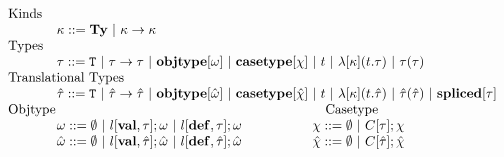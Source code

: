 \begin{figure}[ht]
\[
	\begin{array}{llcl}
      \text{Kinds}\\
      ~~~~~~~~~~~	\kappa ::=  \mathbf{Ty}  ~|~ \kappa \rightarrow \kappa\\
      \text{Types}\\
      ~~~~~~~~~~~	 \tau  ::=  \mathtt{T} ~|~ \tau \rightarrow \tau ~|~ \mathbf{objtype}[\omega] ~|~ \mathbf{casetype}[\chi] ~|~  t ~|~ \lambda[\kappa](t.\tau) ~|~ \tau(\tau) \\
      \text{Translational Types}\\
      ~~~~~~~~~~~\hat{\tau} ::= \mathtt{T} ~|~ \hat\tau \rightarrow \hat\tau ~|~ \mathbf{objtype}[\hat\omega] ~|~ \mathbf{casetype}[\hat\chi] ~|~  t ~|~ \lambda[\kappa](t.\hat\tau) ~|~ \hat\tau(\hat\tau) ~|~ \mathbf{spliced}[\tau]\\
      \text{Objtype}~~~~~~~~~~~~~~~~~~~~~~~~~~~~~~~~~~~~~~~~~~~~~~~~~~~~~~~~~~~~~\text{Casetype}\\
      ~~~~~~~~~~~\omega ::= \emptyset ~|~ l[\mathbf{val},\tau];\omega ~|~ l[\mathbf{def},\tau];\omega ~~~~~ ~~~~~~~~~~~\chi ::= \emptyset ~|~ C[\tau];\chi\\
      ~~~~~~~~~~~\hat\omega ::= \emptyset ~|~ l[\mathbf{val},\hat\tau];\hat\omega ~|~ l[\mathbf{def},\hat\tau];\hat\omega ~~~~~ ~~~~~~~~~~~\hat\chi ::= \emptyset ~|~ C[\hat\tau];\hat\chi
  \end{array}
\]
\label{syntax-types}
\end{figure}